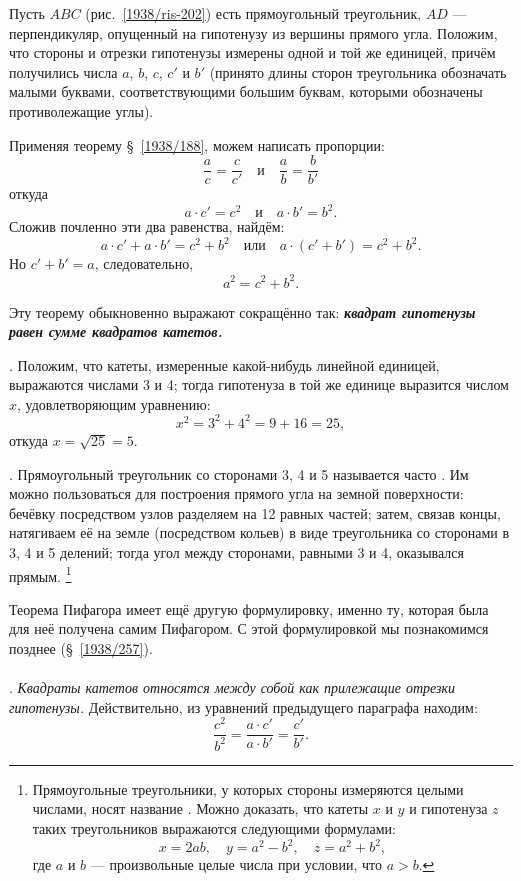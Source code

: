\documentclass[oneside]{book}
\begin{document}
Пусть $ABC$ (рис.~\ref{1938/ris-202}) есть прямоугольный треугольник, $AD$ — перпендикуляр, опущенный на гипотенузу из вершины прямого угла.
Положим, что стороны и отрезки гипотенузы измерены одной и той же единицей, причём получились числа $a$, $b$, $c$, $c'$ и $b'$ (принято длины сторон треугольника обозначать малыми буквами, соответствующими большим буквам, которыми обозначены противолежащие углы).

Применяя теорему §~\ref{1938/188}, можем написать пропорции:
\[\frac ac=\frac c{c'}
\quad\text{и}\quad
\frac ab=\frac b{b'}\]
откуда 
\[a\cdot c'=c^2
\quad\text{и}\quad
a\cdot b'=b^2.\]
Сложив почленно эти два равенства, найдём:
\[a\cdot c'+a\cdot b'=c^2+b^2
\quad\text{или}\quad
a\cdot (c'+b')=c^2+b^2.\]
Но $c'+b'=a$, следовательно,
\[a^2=c^2+b^2.\]

Эту теорему обыкновенно выражают сокращённо так:
\textbf{\emph{квадрат гипотенузы равен сумме квадратов катетов.}}

.
Положим, что катеты, измеренные какой-нибудь линейной единицей, выражаются числами 3 и 4;
тогда гипотенуза в той же единице выразится числом $x$, удовлетворяющим уравнению:
\[x^2=3^2+4^2=9+16=25,\]
откуда $x = \sqrt{25} = 5$.

.
Прямоугольный треугольник со сторонами 3, 4 и 5 называется часто . 
Им можно пользоваться для построения прямого угла на земной поверхности:
бечёвку посредством узлов разделяем на 12 равных частей;
затем, связав концы, натягиваем её на земле (посредством кольев) в виде треугольника со сторонами в 3, 4 и 5 делений;
тогда угол между сторонами, равными 3 и 4, оказывался прямым.%
\footnote{Прямоугольные треугольники, у которых стороны измеряются целыми числами, носят название .
Можно доказать, что катеты $x$ и $y$ и гипотенуза $z$ таких треугольников выражаются следующими формулами:
\[x=2ab,
\quad
y=a^2-b^2,
\quad
z=a^2+b^2,\]
где $a$ и $b$ — произвольные целые числа при условии, что $a>b$.%
}

Теорема Пифагора имеет ещё другую формулировку, именно ту, которая была для неё получена самим Пифагором.
С этой формулировкой мы познакомимся позднее (§~\ref{1938/257}).

\paragraph{}\label{1938/192}
.
\emph{Квадраты катетов относятся между собой как прилежащие отрезки гипотенузы.}
Действительно, из уравнений предыдущего параграфа находим:
\[\frac{c^2}{b^2}=\frac{a\cdot c'}{a\cdot b'}=\frac{c'}{b'}.\]
\end{document}
